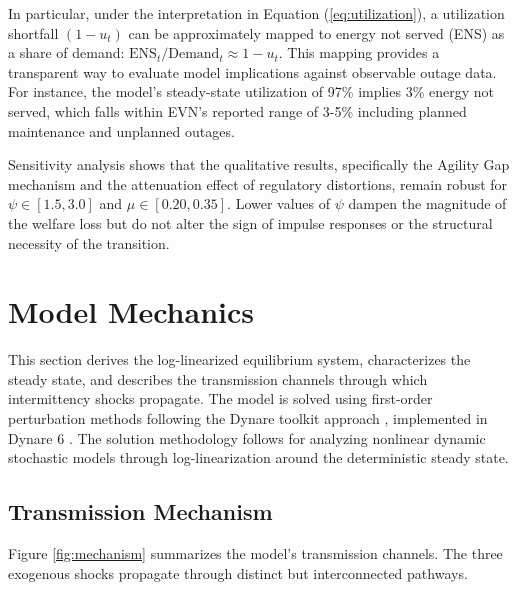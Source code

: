 \documentclass[12pt, a4paper]{article}
\begin{document}
	In particular, under the interpretation in Equation (\ref{eq:utilization}), a utilization shortfall $(1-u_t)$ can be approximately mapped to energy not served (ENS) as a share of demand: $\text{ENS}_t/\text{Demand}_t \approx 1-u_t$. This mapping provides a transparent way to evaluate model implications against observable outage data. For instance, the model's steady-state utilization of 97\% implies 3\% energy not served, which falls within EVN's reported range of 3-5\% including planned maintenance and unplanned outages.
	
	Sensitivity analysis shows that the qualitative results, specifically the Agility Gap mechanism and the attenuation effect of regulatory distortions, remain robust for $\psi \in [1.5, 3.0]$ and $\mu \in [0.20, 0.35]$. Lower values of $\psi$ dampen the magnitude of the welfare loss but do not alter the sign of impulse responses or the structural necessity of the transition.
	
	\section{Model Mechanics} \label{sec:mechanics}
	
	This section derives the log-linearized equilibrium system, characterizes the steady state, and describes the transmission channels through which intermittency shocks propagate. The model is solved using first-order perturbation methods following the Dynare toolkit approach \citep{Adjemianetal2024}, implemented in Dynare 6 \citep{Adjemianetal2024}. The solution methodology follows \citet{uhlig1999} for analyzing nonlinear dynamic stochastic models through log-linearization around the deterministic steady state.
	
	\subsection{Transmission Mechanism}
	
	Figure \ref{fig:mechanism} summarizes the model's transmission channels. The three exogenous shocks propagate through distinct but interconnected pathways.
	
\end{document}
